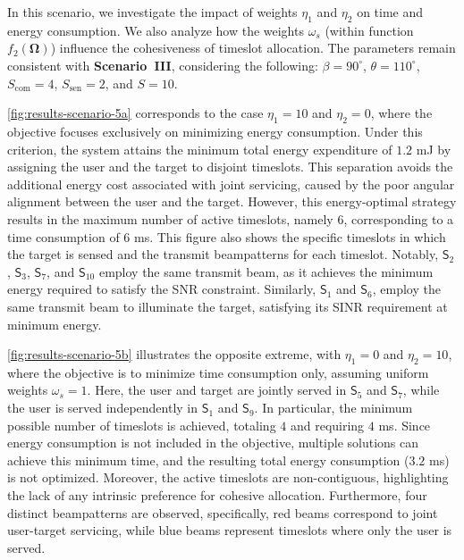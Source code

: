 \documentclass[10pt,journal,compsoc]{IEEEtran}
\theoremstyle{myremark}
\theoremstyle{myexample}
\begin{document}
In this scenario, we investigate the impact of weights $ \eta_1 $ and $ \eta_2 $ on time and energy consumption. We also analyze how the weights $ \omega_s $ (within function $ f_2(\boldsymbol{\Omega}) $) influence the cohesiveness of timeslot allocation. The parameters remain consistent with \textbf{Scenario~III}, considering the following: $ \beta = 90^\circ $, $ \theta = 110^\circ $, $ S_\mathrm{com} = 4 $, $ S_\mathrm{sen} = 2 $, and $ S = 10 $.


\cref{fig:results-scenario-5a} corresponds to the case $ \eta_1 = 10 $ and $ \eta_2 = 0 $, where the objective focuses exclusively on minimizing energy consumption. Under this criterion, the system attains the minimum total energy expenditure of $ 1.2 $ mJ by assigning the user and the target to disjoint timeslots. This separation avoids the additional energy cost associated with joint servicing, caused by the poor angular alignment between the user and the target. However, this energy-optimal strategy results in the maximum number of active timeslots, namely $ 6 $, corresponding to a time consumption of $ 6 $ ms. This figure also shows the specific timeslots in which the target is sensed and the transmit beampatterns for each timeslot. Notably, $ \mathsf{S}_{2} $, $ \mathsf{S}_{3} $, $ \mathsf{S}_{7} $, and $ \mathsf{S}_{10} $ employ the same transmit beam, as it achieves the minimum energy required to satisfy the \gls{SNR} constraint. Similarly, $ \mathsf{S}_{1} $ and $ \mathsf{S}_{6} $, employ the same transmit beam to illuminate the target, satisfying its \gls{SINR} requirement at minimum energy.


\cref{fig:results-scenario-5b} illustrates the opposite extreme, with $ \eta_1 = 0 $ and $ \eta_2 = 10 $, where the objective is to minimize time consumption only, assuming uniform weights $ \omega_s = 1 $. Here, the user and target are jointly served in $ \mathsf{S}_{5} $ and $ \mathsf{S}_{7} $, while the user is served independently in $ \mathsf{S}_{1} $ and $ \mathsf{S}_{9} $. In particular, the minimum possible number of timeslots is achieved, totaling $ 4 $ and requiring $ 4 $ ms. Since energy consumption is not included in the objective, multiple solutions can achieve this minimum time, and the resulting total energy consumption ($ 3.2 $ ms) is not optimized. Moreover, the active timeslots are non-contiguous, highlighting the lack of any intrinsic preference for cohesive allocation. Furthermore, four distinct beampatterns are observed, specifically, red beams correspond to joint user-target servicing, while blue beams represent timeslots where only the user is served.
\end{document}
